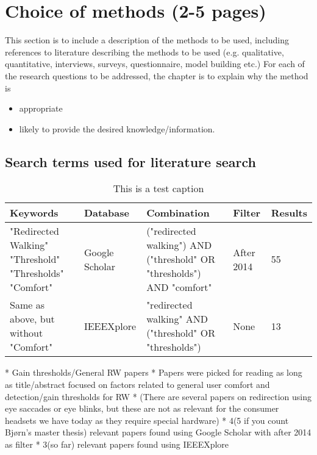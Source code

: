\chapter{Choice of methods (2-5 pages)}
This section is to include a description of the methods to be used,
including references to literature describing the methods to be used
(e.g. qualitative, quantitative, interviews, surveys,
questionnaire,  model building etc.)
For each of the research questions to be addressed,
the chapter is to explain why the method is
\begin{itemize}
\item appropriate
\item likely to provide the desired knowledge/information.
\end{itemize}

\section{Search terms used for literature search}
\begin{table}[h!]
\centering
\begin{tabularx}{\textwidth}{|X|m{1.7cm}|X|m{1.5cm}|m{1.20cm}|} 
\hline
Keywords & Database & Combination & Filter & Results\\ 
\hline
"Redirected Walking"\newline
"Threshold"\newline
"Thresholds"\newline
"Comfort"& Google Scholar & ("redirected walking") AND ("threshold" OR "thresholds") AND "comfort" & After 2014 & 55\\ 
\hline
Same as above, but without "Comfort" & IEEEXplore & "redirected walking" AND ("threshold" OR "thresholds") & None & 13\\ 
\hline
\end{tabularx}
\caption{This is a test caption}
\label{table:literaturekeywords}
\end{table}
    
    * Gain thresholds/General RW papers
        * Papers were picked for reading as long as title/abstract focused on factors related to general user comfort and detection/gain thresholds for RW
        * (There are several papers on redirection using eye saccades or eye blinks, but these are not as relevant for the consumer headsets we have today as they require special hardware)
        * 4(5 if you count Bjørn's master thesis) relevant papers found using Google Scholar with after 2014 as filter
        * 3(so far) relevant papers found using IEEEXplore